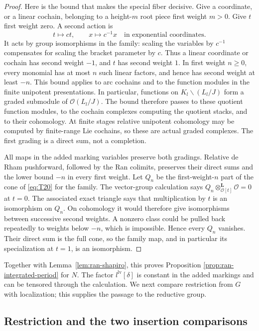 \begin{proof}
Here is the bound that makes the special fiber decisive.  Give a
coordinate, or a linear cochain, belonging to a height-$m$ root piece
first weight $m>0$.  Give $t$ first weight zero.  A second action is
\[
             t\longmapsto c t,\qquad x\longmapsto c^{-1}x
             \quad\text{in exponential coordinates}.
\]
It acts by group isomorphisms in the family: scaling the variables by
$c^{-1}$ compensates for scaling the bracket parameter by $c$.
Thus a linear coordinate or cochain has second weight $-1$, and $t$ has
second weight $1$.  In first weight $n\geq0$, every monomial has at most
$n$ such linear factors, and hence has second weight at least $-n$.
This bound applies to arc cochains and to the function modules in the
finite unipotent presentations.  In particular, functions on
$K_l\backslash(L_l/J)$ form a graded submodule of
$\mathcal O(L_l/J)$.  The bound therefore passes to these quotient
function modules, to the cochain complexes computing the quotient
stacks, and to their cohomology.  At finite stages relative unipotent cohomology may be
computed by finite-range Lie cochains, so these are actual graded
complexes.  The first grading is a direct sum, not a completion.

All maps in the added marking variables preserve both gradings.  Relative
de Rham pushforward, followed by the Ran colimits, preserves their direct
sums and the lower bound $-n$ in every first weight.  Let $Q_n$ be the
first-weight-$n$ part of the cone of \eqref{eq:T20} for the family.  The
vector-group calculation says
$Q_n\otimes^{\mathbf L}_{\mathcal O[t]}\mathcal O=0$ at $t=0$.
The associated exact triangle says that multiplication by $t$ is an
isomorphism on $Q_n$.  On cohomology it would therefore give isomorphisms
between successive second weights.  A nonzero class could be pulled back
repeatedly to weights below $-n$, which is impossible.  Hence every $Q_n$
vanishes.  Their direct sum is the full cone, so the family map, and in
particular its specialization at $t=1$, is an isomorphism.
\end{proof}

Together with Lemma~\ref{lem:ran-shapiro}, this proves Proposition
\ref{prop:ran-integrated-period} for $N$.  The factor
$l^{\mathrm{lv}}[\delta]$ is constant in the added markings and can be
tensored through the calculation.  We next compare restriction from $G$
with localization; this supplies the passage to the reductive group.

\subsection{Restriction and the two insertion comparisons}

